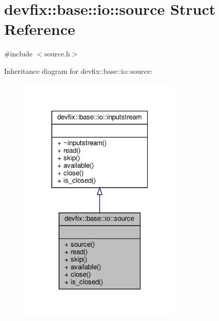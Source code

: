 \hypertarget{structdevfix_1_1base_1_1io_1_1source}{}\section{devfix\+:\+:base\+:\+:io\+:\+:source Struct Reference}
\label{structdevfix_1_1base_1_1io_1_1source}


{\ttfamily \#include $<$source.\+h$>$}



Inheritance diagram for devfix\+:\+:base\+:\+:io\+:\+:source\+:\nopagebreak
\begin{figure}[H]
\begin{center}
\leavevmode
\includegraphics[width=220pt]{structdevfix_1_1base_1_1io_1_1source__inherit__graph}
\end{center}
\end{figure}
